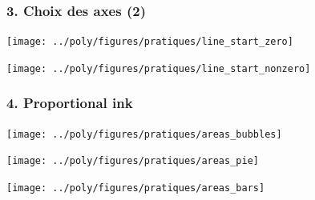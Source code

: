 \documentclass[sans,14pt]{beamer}
\begin{document}
{\begin{frame}
  \frametitle{3. Choix des axes (2)}
  \begin{minipage}[h]{0.49\linewidth}
    \begin{center}
      \texttt{[image: ../poly/figures/pratiques/line\_start\_zero]}
    \end{center}
  \end{minipage}%
  \pause
  \hfill
  \begin{minipage}[h]{0.49\linewidth}
    \begin{center}
      \texttt{[image: ../poly/figures/pratiques/line\_start\_nonzero]}
    \end{center}
  \end{minipage}%
\end{frame}

\begin{frame}
  \frametitle{4. Proportional ink}
  \begin{minipage}[h]{0.49\linewidth}
    \begin{center}
      \texttt{[image: ../poly/figures/pratiques/areas\_bubbles]}
    \end{center}
  \end{minipage}%
  \hfill
  \pause
  \begin{minipage}[h]{0.49\linewidth}
    \begin{center}
      \texttt{[image: ../poly/figures/pratiques/areas\_pie]}
    \end{center}
  \end{minipage}
  \pause
  \begin{minipage}[h]{0.49\linewidth}
    \begin{center}
      \texttt{[image: ../poly/figures/pratiques/areas\_bars]}
    \end{center}
  \end{minipage}  
\end{frame}


}
\end{document}
